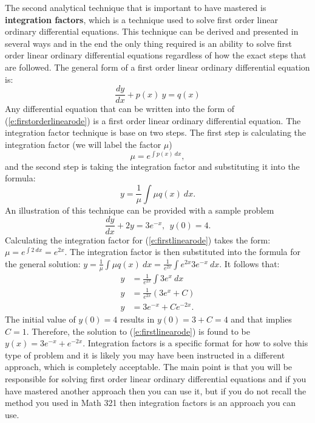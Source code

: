 \documentclass[twoside]{article}
\def\ds{\displaystyle}
\begin{document}
The second analytical technique that is important to have mastered is {\bf integration factors}, which is a technique used to solve first order linear ordinary differential equations. This technique can be derived and presented in several ways and in the end the only thing required is an ability to solve first order linear ordinary differential equations regardless of how the exact steps that are followed. The general form of a first order linear ordinary differential equation is:
\begin{equation}
\frac {dy}{dx} + p(x) \ y = q(x)
\label{e:firstorderlinearode}
\end{equation}
Any differential equation that can be written into the form of (\ref{e:firstorderlinearode}) is a first order linear ordinary differential equation. The integration factor technique is base on two steps. The first step is calculating the integration factor (we will label the factor $\mu$)
$$\mu = e^{\int p(x) \ dx},$$
and the second step is taking the integration factor and substituting it into the formula:
$$y = \frac 1{\mu} \int \mu q(x) \ dx.$$
An illustration of this technique can be provided with a  sample problem
\begin{equation}
\frac {dy}{dx} + 2y = 3e^{-x}, \ \ y(0) = 4.
\label{e:firstlinearode}
\end{equation}
Calculating the integration factor for (\ref{e:firstlinearode}) takes the form: $\ds \mu = e^{\int 2 \ dx} = e^{2x}$. The integration factor is then substituted into the formula for the general solution: $\ds y = \frac 1{\mu} \int \mu q(x) \ dx = \frac 1{e^{2x}} \int e^{2x}3e^{-x} \ dx$. It follows that:
\begin{eqnarray*}
y &= \frac 1 {e^{2x}} \int 3 e^x \ dx  \\
y &= \frac 1 {e^{2x}} (3 e^x +C) \\
y &= 3e^{-x} + C e^{-2x}.
 \end{eqnarray*}
 The initial value of $y(0)=4$ results in $\ds y(0) = 3+C = 4$ and that implies $C=1$. Therefore, the solution to (\ref{e:firstlinearode}) is found to be $\ds y(x) =  3e^{-x} + e^{-2x}$. Integration factors is a specific format for how to solve this type of problem and it is likely you may have been instructed in a different approach, which is completely acceptable. The main point is that you will be responsible for solving first order linear ordinary differential equations and if you have mastered another approach then you can use it, but if you do not recall the method you used in Math 321 then integration factors is an approach you can use. 
 
\end{document}
